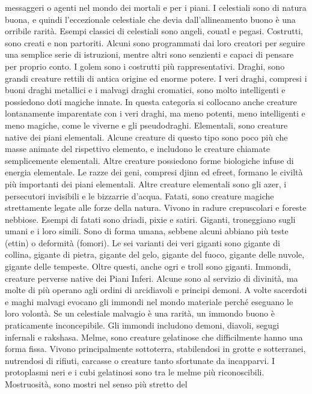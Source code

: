 \begin{multicols}{2}
messaggeri o agenti nel mondo dei mortali e per i piani.
I celestiali sono di natura buona, e quindi l’eccezionale
celestiale che devia dall’allineamento buono è una
orribile rarità. Esempi classici di celestiali sono angeli,
couatl e pegasi.
Costrutti, sono creati e non partoriti. Alcuni sono
programmati dai loro creatori per seguire una semplice
serie di istruzioni, mentre altri sono senzienti e capaci di
pensare per proprio conto. I golem sono i costrutti più
rappresentativi.
Draghi, sono grandi creature rettili di antica origine ed
enorme potere. I veri draghi, compresi i buoni draghi
metallici e i malvagi draghi cromatici, sono molto
intelligenti e possiedono doti magiche innate. In questa
categoria si collocano anche creature lontanamente
imparentate con i veri draghi, ma meno potenti, meno
intelligenti e meno magiche, come le viverne e gli
pseudodraghi.
Elementali, sono creature native dei piani elementali.
Alcune creature di questo tipo sono poco più che
masse animate del rispettivo elemento, e includono le
creature chiamate semplicemente elementali. Altre
creature possiedono forme biologiche infuse di energia
elementale. Le razze dei geni, compresi djinn ed efreet,
formano le civiltà più importanti dei piani elementali.
Altre creature elementali sono gli azer, i persecutori
invisibili e le bizzarrie d’acqua.
Fatati, sono creature magiche strettamente legate alle
forze della natura. Vivono in radure crepuscolari e
foreste nebbiose. Esempi di fatati sono driadi, pixie e
satiri.
Giganti, troneggiano sugli umani e i loro simili. Sono di
forma umana, sebbene alcuni abbiano più teste (ettin) o
deformità (fomori). Le sei varianti dei veri giganti sono
gigante di collina, gigante di pietra, gigante del gelo,
gigante del fuoco, gigante delle nuvole, gigante delle
tempeste. Oltre questi, anche ogri e troll sono giganti.
Immondi, creature perverse native dei Piani Inferi.
Alcune sono al servizio di divinità, ma molte di più
operano agli ordini di arcidiavoli e principi demoni. A
volte sacerdoti e maghi malvagi evocano gli immondi
nel mondo materiale perché eseguano le loro volontà.
Se un celestiale malvagio è una rarità, un immondo
buono è praticamente inconcepibile. Gli immondi
includono demoni, diavoli, segugi infernali e rakshasa.
Melme, sono creature gelatinose che difficilmente
hanno una forma fissa. Vivono principalmente
sottoterra, stabilendosi in grotte e sotterranei,
nutrendosi di rifiuti, carcasse o creature tanto sfortunate
da incapparvi. I protoplasmi neri e i cubi gelatinosi sono
tra le melme più riconoscibili.
Mostruosità, sono mostri nel senso più stretto del

\end{multicols}
